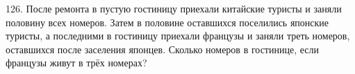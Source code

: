 126. После ремонта в пустую гостиницу приехали китайские туристы и заняли половину всех номеров. Затем в половине оставшихся поселились японские туристы, а последними в гостиницу приехали французы и заняли треть номеров, оставшихся после заселения японцев. Сколько номеров в гостинице, если французы живут в трёх номерах?\\

